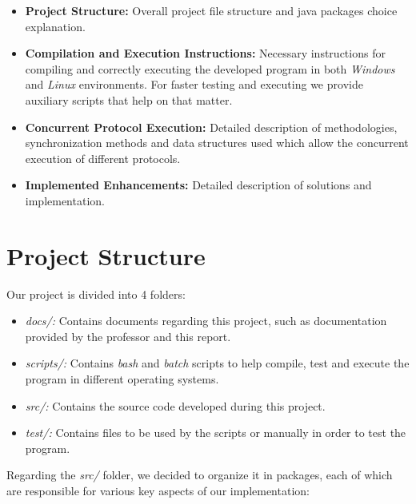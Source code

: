 \documentclass[a4paper]{article}
\begin{document}
    \begin{itemize}
        \item \textbf{Project Structure:} Overall project file structure and java packages choice explanation.
        
        \item \textbf{Compilation and Execution Instructions:} Necessary instructions for compiling and correctly executing the developed program in both \textit{Windows} and \textit{Linux} environments. For faster testing and executing we provide auxiliary scripts that help on that matter.
      
        \item \textbf{Concurrent Protocol Execution:} Detailed description of methodologies, synchronization methods and data structures used which allow the concurrent execution of different protocols.
        
        \item \textbf{Implemented Enhancements:} Detailed description of solutions and implementation.
    \end{itemize}

\newpage

\section{Project Structure}

    Our project is divided into 4 folders:
    
    \begin{itemize}
        \item \textit{docs/:} Contains documents regarding this project, such as documentation provided by the professor and this report.
        
        \item \textit{scripts/:} Contains \textit{bash} and \textit{batch} scripts to help compile, test and execute the program in different operating systems.
        
        \item \textit{src/:} Contains the source code developed during this project.
        
        \item \textit{test/:} Contains files to be used by the scripts or manually in order to test the program.
    \end{itemize}
    
    Regarding the \textit{src/} folder, we decided to organize it in packages, each of which are responsible for various key aspects of our implementation:
    
\end{document}
